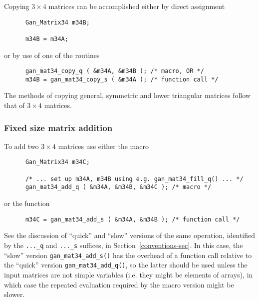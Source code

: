 Copying $3\times 4$ matrices can be accomplished either by direct assignment
\begin{verbatim}
      Gan_Matrix34 m34B;

      m34B = m34A;
\end{verbatim}
or by use of one of the routines
\begin{verbatim}
      gan_mat34_copy_q ( &m34A, &m34B ); /* macro, OR */
      m34B = gan_mat34_copy_s ( &m34A ); /* function call */
\end{verbatim}
The methods of copying general, symmetric and lower triangular matrices follow
that of $3\times 4$ matrices.

\subsubsection{Fixed size matrix addition}
To add two $3\times4$ matrices use either the macro
\begin{verbatim}
      Gan_Matrix34 m34C;

      /* ... set up m34A, m34B using e.g. gan_mat34_fill_q() ... */
      gan_mat34_add_q ( &m34A, &m34B, &m34C ); /* macro */
\end{verbatim}
or the function
\begin{verbatim}
      m34C = gan_mat34_add_s ( &m34A, &m34B ); /* function call */
\end{verbatim}
See the discussion of ``quick'' and ``slow'' versions of the same operation,
identified by the {\tt ...\_q} and {\tt ...\_s} suffices,
in Section~\ref{conventions-sec}. In this case, the ``slow'' version
{\tt gan\_mat34\_add\_s()} has the overhead of a function call relative
to the ``quick'' version {\tt gan\_mat34\_add\_q()}, so the latter should
be used unless the input matrices are not simple variables (i.e. they might
be elements of arrays), in which case the repeated evaluation required
by the macro version might be slower.

